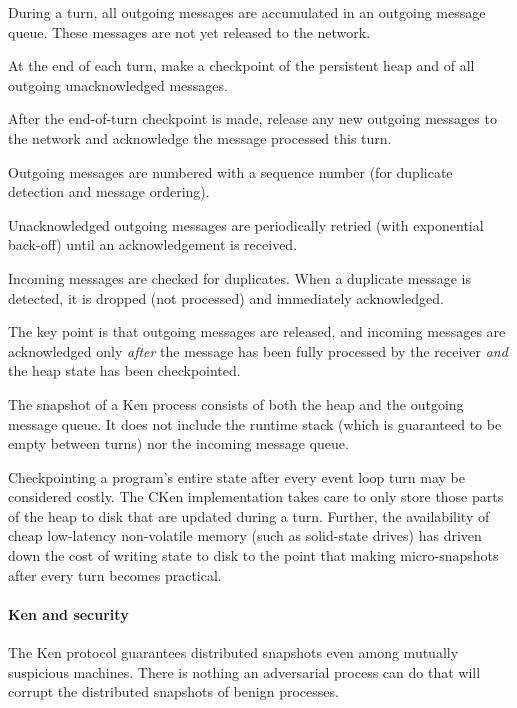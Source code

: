 \documentclass{llncs}
\begin{document}
\begin{itemize*}
  \item During a turn, all outgoing messages are accumulated in an outgoing message queue. These messages are not yet released to the network.
  \item At the end of each turn, make a checkpoint of the persistent heap and of all outgoing unacknowledged messages.
  \item After the end-of-turn checkpoint is made, release any new outgoing messages to the network and acknowledge the message processed this turn.
  \item Outgoing messages are numbered with a sequence number (for duplicate detection and message ordering).
  \item Unacknowledged outgoing messages are periodically retried (with exponential back-off) until an acknowledgement is received.
  \item Incoming messages are checked for duplicates. When a duplicate message is detected, it is dropped (not processed) and immediately acknowledged.
\end{itemize*}

The key point is that outgoing messages are released, and incoming messages are acknowledged only \emph{after} the message has been fully processed by the receiver \emph{and} the heap state has been checkpointed.

The snapshot of a Ken process consists of both the heap and the outgoing message queue. It does not include the runtime stack (which is guaranteed to be empty between turns) nor the incoming message queue.

Checkpointing a program's entire state after every event loop turn may be considered costly. The CKen implementation takes care to only store those parts of the heap to disk that are updated during a turn. Further, the availability of cheap low-latency non-volatile memory (such as solid-state drives) has driven down the cost of writing state to disk to the point that making micro-snapshots after every turn becomes practical.

\paragraph{Ken and security}

The Ken protocol guarantees distributed snapshots even among mutually suspicious machines. There is nothing an adversarial process can do that will corrupt the distributed snapshots of benign processes.
\end{document}
